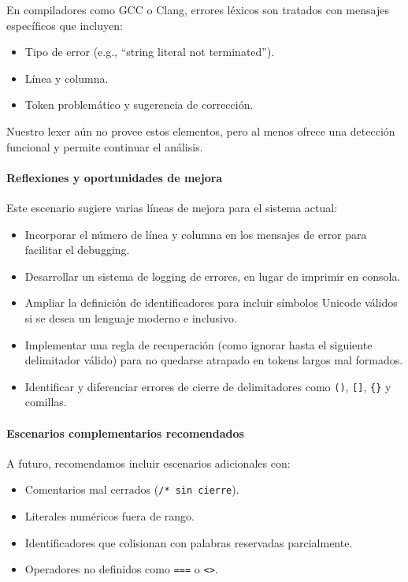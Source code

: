 \documentclass{article}
\begin{document}
En compiladores como GCC o Clang, errores léxicos son tratados con mensajes específicos que incluyen:

\begin{itemize}
  \item Tipo de error (e.g., “string literal not terminated”).
  \item Línea y columna.
  \item Token problemático y sugerencia de corrección.
\end{itemize}

Nuestro lexer aún no provee estos elementos, pero al menos ofrece una detección funcional y permite continuar el análisis.

\paragraph{Reflexiones y oportunidades de mejora}

Este escenario sugiere varias líneas de mejora para el sistema actual:

\begin{itemize}
  \item Incorporar el número de línea y columna en los mensajes de error para facilitar el debugging.
  \item Desarrollar un sistema de logging de errores, en lugar de imprimir en consola.
  \item Ampliar la definición de identificadores para incluir símbolos Unicode válidos si se desea un lenguaje moderno e inclusivo.
  \item Implementar una regla de recuperación (como ignorar hasta el siguiente delimitador válido) para no quedarse atrapado en tokens largos mal formados.
  \item Identificar y diferenciar errores de cierre de delimitadores como \texttt{()}, \texttt{[]}, \texttt{\{\}} y comillas.
\end{itemize}

\paragraph{Escenarios complementarios recomendados}

A futuro, recomendamos incluir escenarios adicionales con:

\begin{itemize}
  \item Comentarios mal cerrados (\texttt{/* sin cierre}).
  \item Literales numéricos fuera de rango.
  \item Identificadores que colisionan con palabras reservadas parcialmente.
  \item Operadores no definidos como \texttt{===} o \texttt{<>}.
\end{itemize}
\end{document}
